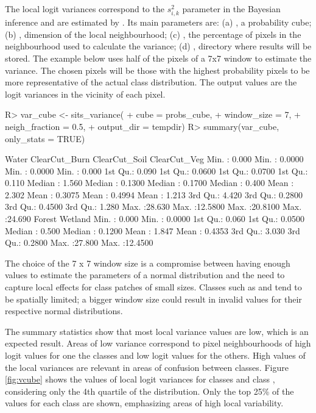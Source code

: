 \documentclass[
  shortnames]{jss}
\begin{document}
The local logit variances correspond to the \(s^2_{i,k}\) parameter in the Bayesian inference and are estimated by . Its main parameters are: (a) , a probability cube; (b) , dimension of the local neighbourhood; (c) , the percentage of pixels in the neighbourhood used to calculate the variance; (d) , directory where results will be stored. The example below uses half of the pixels of a 7x7 window to estimate the variance. The chosen pixels will be those with the highest probability pixels to be more representative of the actual class distribution. The output values are the logit variances in the vicinity of each pixel.

\begin{CodeChunk}
\begin{CodeInput}
R> var_cube <- sits_variance(
+     cube = probs_cube,
+     window_size = 7,
+     neigh_fraction = 0.5,
+     output_dir = tempdir)
R> summary(var_cube, only_stats = TRUE)
\end{CodeInput}
\begin{CodeOutput}
 Water            ClearCut_Burn     ClearCut_Soil     ClearCut_Veg    
 Min.   : 0.000   Min.   : 0.0000   Min.   : 0.0000   Min.   : 0.000  
 1st Qu.: 0.090   1st Qu.: 0.0600   1st Qu.: 0.0700   1st Qu.: 0.110  
 Median : 1.560   Median : 0.1300   Median : 0.1700   Median : 0.400  
 Mean   : 2.302   Mean   : 0.3075   Mean   : 0.4994   Mean   : 1.213  
 3rd Qu.: 4.420   3rd Qu.: 0.2800   3rd Qu.: 0.4500   3rd Qu.: 1.280  
 Max.   :28.630   Max.   :12.5800   Max.   :20.8100   Max.   :24.690  
 Forest           Wetland          
 Min.   : 0.000   Min.   : 0.0000  
 1st Qu.: 0.060   1st Qu.: 0.0500  
 Median : 0.500   Median : 0.1200  
 Mean   : 1.847   Mean   : 0.4353  
 3rd Qu.: 3.030   3rd Qu.: 0.2800  
 Max.   :27.800   Max.   :12.4500  
\end{CodeOutput}
\end{CodeChunk}

The choice of the 7 x 7 window size is a compromise between having enough values to
estimate the parameters of a normal distribution and the need to capture local effects
for class patches of small sizes. Classes such as  and 
tend to be spatially limited; a bigger window size could result in invalid values for
their respective normal distributions.

The summary statistics show that most local variance values are low, which is an expected result. Areas of low variance correspond to pixel neighbourhoods of high logit values for one the classes and low logit values for the others. High values of the local variances are relevant in areas of confusion between classes. Figure \ref{fig:vcube} shows the values of local logit variances for classes  and class , considering only the 4th quartile of the distribution. Only the top 25\% of the values for each class are shown, emphasizing areas of high local variability.
\end{document}
